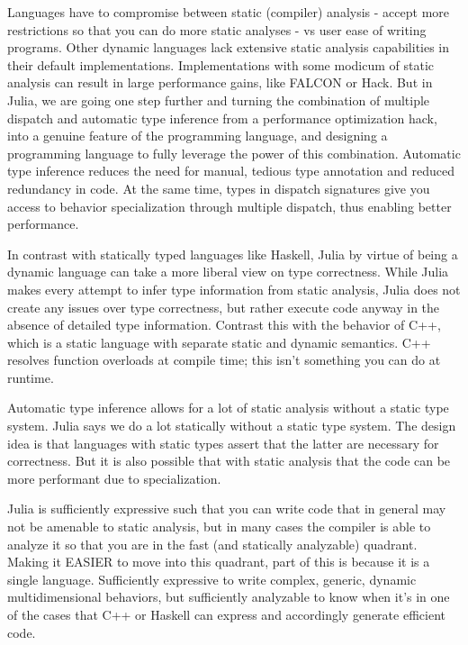 \documentclass[preprint]{sigplanconf}
\begin{document}
Languages have to compromise between static (compiler) analysis - accept more
restrictions so that you can do more static analyses - vs user ease of writing
programs. Other dynamic languages lack extensive static analysis capabilities
in their default implementations. Implementations with some modicum of static
analysis can result in large performance gains, like FALCON or Hack. But in
Julia, we are going one step further and turning the combination of multiple
dispatch and automatic type inference from a performance optimization hack,
into a genuine feature of the programming language, and designing a
programming language to fully leverage the power of this combination.
Automatic type inference reduces the need for manual, tedious type annotation
and reduced redundancy in code. At the same time, types in dispatch signatures
give you access to behavior specialization through multiple dispatch, thus
enabling better performance.

In contrast with statically typed languages like Haskell, Julia by virtue of
being a dynamic language can take a more liberal view on type correctness.
While Julia makes every attempt to infer type information from static
analysis, Julia does not create any issues over type correctness, but rather
execute code anyway in the absence of detailed type information. Contrast this
with the behavior of C++, which is a static language with separate static and
dynamic semantics. C++ resolves function overloads at compile time; this isn't
something you can do at runtime.

Automatic type inference allows for a lot of static analysis without a static
type system. Julia says we do a lot statically without a static type system.
The design idea is that languages with static types assert that the latter are
necessary for correctness. But it is also possible that with static analysis
that the code can be more performant due to specialization.

Julia is sufficiently expressive such that you can write code that in general
may not be amenable to static analysis, but in many cases the compiler is able
to analyze it so that you are in the fast (and statically analyzable)
quadrant. Making it EASIER to move into this quadrant, part of this is because
it is a single language. Sufficiently expressive to write complex, generic,
dynamic multidimensional behaviors, but sufficiently analyzable to know when
it's in one of the cases that C++ or Haskell can express and accordingly
generate efficient code.
\end{document}
